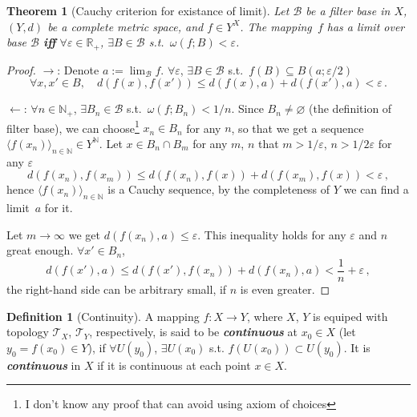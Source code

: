\documentclass[openany]{book}
\newcommand*{\indexbf}[1]{\emph{\textbf{#1}}\index{#1}} %
\theoremstyle{plain}
\newtheorem{theorem}{Theorem}[section] %
\theoremstyle{definition}
\newtheorem{definition}{Definition}[section] %
\newcommand{\emphbf}[1]{\emph{\textbf{#1}}}
\begin{document}
\begin{theorem}[Cauchy criterion for existance of limit]
	\label{theorem: Cauchy criterion of existance of limit}
	Let $\mathscr B$ be a filter base in $X$, $(Y, d)$ be a complete metric space, and $f \in Y^X$.
	The mapping~$f$ has a limit over base $\mathscr B$ \emphbf{iff}
	$\forall \varepsilon \in \mathbb R_+$, $\exists B \in \mathscr B$ s.t.\ $\omega(f; B) < \varepsilon$.
\end{theorem}
\begin{proof}
	$\to$:
	Denote $a := \lim_{\mathscr B} f$.
	$\forall \varepsilon$, $\exists B \in \mathscr B$ s.t.\ $f(B) \subseteq B(a; \varepsilon/2)$
	\begin{equation*}
		\forall x, x' \in B,\quad
		d(f(x), f(x')) \leq d(f(x), a) + d(f(x'), a) < \varepsilon\,.
	\end{equation*}

	$\gets$:
	$\forall n \in \mathbb N_+$, $\exists B_n \in \mathscr B$ s.t.\ $\omega(f; B_n) < 1/n$. 
	Since $B_n \neq \varnothing$ (the definition of filter base), we can choose\footnote{I don't know any proof that can avoid using axiom of choices} $x_n \in B_n$ for any $n$, so that we get a sequence $\langle f(x_n) \rangle_{n \in \mathbb N} \in Y^\mathbb N$. Let $x \in B_n \cap B_m$ for any $m$, $n$ that $m > 1/\varepsilon$, $n > 1/ 2\varepsilon$ for any $\varepsilon$
	\begin{equation*}
		d(f(x_n), f(x_m)) \leq d(f(x_n), f(x)) + d(f(x_m), f(x)) < \varepsilon\,,
	\end{equation*}
	hence $\langle f(x_n) \rangle_{n \in \mathbb N}$ is a Cauchy sequence, by the completeness of $Y$ we can find a limit~$a$ for it.

	Let $m \to \infty$ we get $d(f(x_n), a) \leq \varepsilon$. This inequality holds for any $\varepsilon$ and $n$ great enough.
	$\forall x' \in B_n$,
	\begin{equation*}
		d(f(x'), a) \leq d(f(x'), f(x_n)) + d(f(x_n), a)
		< \frac 1 n + \varepsilon\,,
	\end{equation*}
	the right-hand side can be arbitrary small, if $n$ is even greater.
\end{proof}

\begin{definition}[Continuity]
		\label{definition: continuous}
	A mapping $f \colon X \to Y$, where $X$, $Y$ is equiped with topology $\mathscr T_X$, $\mathscr T_Y$, respectively, is said to be \indexbf{continuous} at $x_0 \in X$ (let $y_0 = f( x_0 ) \in Y$), if $\forall U( y_0 )$, $\exists U( x_0 )$ s.t. $f( U(x_0) )\subset U( y_0 )$. 
	It is \indexbf{continuous} in $X$ if it is continuous at each point $x \in X$. 
\end{definition}
\end{document}
